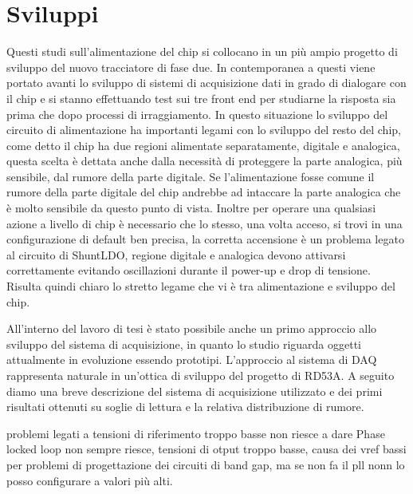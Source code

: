 \section{Sviluppi}
Questi studi sull'alimentazione del chip si collocano in un più ampio progetto di sviluppo del nuovo tracciatore di fase due. In contemporanea a questi viene portato avanti lo sviluppo di sistemi di acquisizione dati in grado di dialogare con il chip e si stanno effettuando test sui tre front end per studiarne la risposta sia prima che dopo processi di irraggiamento. 
In questo situazione lo sviluppo del circuito di alimentazione ha importanti legami con lo sviluppo del resto del chip, come detto il chip ha due regioni alimentate separatamente, digitale e analogica, questa scelta è dettata anche dalla necessità di proteggere la parte analogica, più sensibile, dal rumore della parte digitale. Se l'alimentazione fosse comune il rumore della parte digitale del chip andrebbe ad intaccare la parte analogica che è molto sensibile da questo punto di vista. 
Inoltre per operare una qualsiasi azione a livello di chip è necessario che lo stesso, una volta acceso, si trovi in una configurazione di default ben precisa, la corretta accensione è un problema legato al circuito di ShuntLDO, regione digitale e analogica devono attivarsi correttamente evitando oscillazioni durante il power-up e drop di tensione. 
Risulta quindi chiaro lo stretto legame che vi è tra alimentazione e sviluppo del chip. 

All'interno del lavoro di tesi è stato possibile anche un primo approccio allo sviluppo del sistema di acquisizione, in quanto lo studio riguarda oggetti attualmente in evoluzione essendo prototipi. L'approccio al sistema di DAQ rappresenta naturale in un'ottica di sviluppo del progetto di RD53A. A seguito diamo una breve descrizione del sistema di acquisizione utilizzato e dei primi risultati ottenuti su soglie di lettura e la relativa distribuzione di rumore. 



problemi legati a tensioni di riferimento troppo basse non riesce a dare Phase locked loop non sempre riesce, tensioni di otput troppo basse, causa dei vref bassi per problemi di progettazione dei circuiti di band gap, ma se non fa il pll nonn lo posso configurare a valori più alti.

